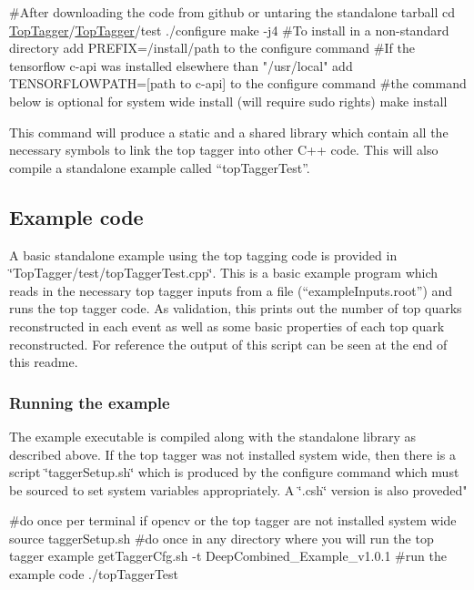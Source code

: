 \begin{DoxyCode}
\textcolor{preprocessor}{#After downloading the code from github or untaring the standalone tarball }
\textcolor{preprocessor}{}cd \hyperlink{classTopTagger}{TopTagger}/\hyperlink{classTopTagger}{TopTagger}/test
./configure
make -j4
\textcolor{preprocessor}{#To install in a non-standard directory add PREFIX=/install/path to the configure command}
\textcolor{preprocessor}{}\textcolor{preprocessor}{#If the tensorflow c-api was installed elsewhere than "/usr/local" add TENSORFLOWPATH=[path to c-api] to
       the configure command}
\textcolor{preprocessor}{}\textcolor{preprocessor}{#the command below is optional for system wide install (will require sudo rights)}
\textcolor{preprocessor}{make install}
\end{DoxyCode}


This command will produce a static and a shared library which contain all the necessary symbols to link the top tagger into other C++ code. This will also compile a standalone example called ``top\-Tagger\-Test''.

\subsection*{Example code}

A basic standalone example using the top tagging code is provided in \char`\"{}\-Top\-Tagger/test/top\-Tagger\-Test.\-cpp\char`\"{}. This is a basic example program which reads in the necessary top tagger inputs from a file (``example\-Inputs.root'') and runs the top tagger code. As validation, this prints out the number of top quarks reconstructed in each event as well as some basic properties of each top quark reconstructed. For reference the output of this script can be seen at the end of this readme.

\subsubsection*{Running the example}

The example executable is compiled along with the standalone library as described above. If the top tagger was not installed system wide, then there is a script \char`\"{}tagger\-Setup.\-sh\char`\"{} which is produced by the configure command which must be sourced to set system variables appropriately. A \char`\"{}.\-csh\char`\"{} version is also proveded"


\begin{DoxyCode}
\textcolor{preprocessor}{#do once per terminal if opencv or the top tagger are not installed system wide}
\textcolor{preprocessor}{}source taggerSetup.sh
\textcolor{preprocessor}{#do once in any directory where you will run the top tagger example}
\textcolor{preprocessor}{}getTaggerCfg.sh -t DeepCombined\_Example\_v1.0.1
\textcolor{preprocessor}{#run the example code}
\textcolor{preprocessor}{./topTaggerTest}
\end{DoxyCode}


